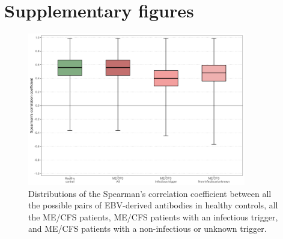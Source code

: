 \clearpage
\section{Supplementary figures}


\begin{figure}[h]
    \centering
    \includegraphics[width=0.85\textwidth]{chapter/2022-revisiting-igg/figures/figa1-ebv-spearmans-correlation.png}
    \caption[Distributions of the Spearman's correlation coefficient between all pairs of EBV-derived antibodies on studied populations]{Distributions of the Spearman's correlation coefficient between all the possible pairs of EBV-derived antibodies in healthy controls, all the ME/CFS patients, ME/CFS patients with an infectious trigger, and ME/CFS patients with a non-infectious or unknown trigger.}
    \label{appendix:figa1-ebv-spearmans-correlation}
\end{figure}
